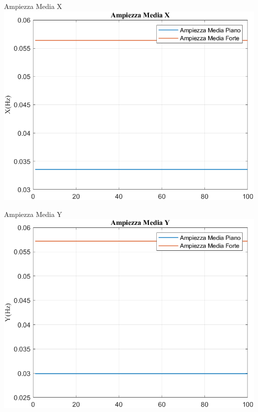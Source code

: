 	\begin{frame}{{Ampiezza Media X}}					
		\centering\includegraphics[height=.8\textheight]{figure/Mag/Trasformata/Ampiezza MediaX}
	\end{frame}
	
	\begin{frame}{{Ampiezza Media Y}}					
		\centering\includegraphics[height=.8\textheight]{figure/Mag/Trasformata/Ampiezza MediaY}
	\end{frame}
	
